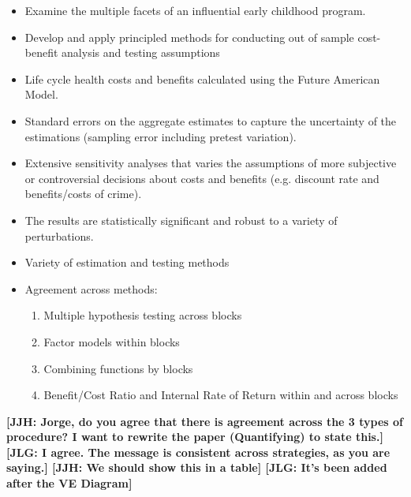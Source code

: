 \documentclass[static]{JJH-Beamer}
\begin{document}
\begin{frame}

\begin{itemize}
\item Examine the multiple facets of an influential early childhood program.
\item Develop and apply principled methods for conducting out of sample cost-benefit analysis and testing assumptions
\item Life cycle health costs and benefits calculated using the Future American Model.
\item Standard errors on the aggregate estimates to capture the uncertainty of the estimations (sampling error including pretest variation).
\item Extensive sensitivity analyses that varies the assumptions of more subjective or controversial decisions about costs and benefits (e.g. discount rate and benefits/costs of crime).
\item The results are statistically significant and robust to a variety of perturbations.
\end{itemize}

\end{frame}

\begin{frame}

\begin{itemize}
\item Variety of estimation and testing methods
\item Agreement across methods:
    \begin{enumerate}
    \item Multiple hypothesis testing across blocks
    \item Factor models within blocks
    \item Combining functions by blocks
    \item Benefit/Cost Ratio and Internal Rate of Return within and across blocks
    \end{enumerate}
\end{itemize}

\end{frame}

\textbf{[JJH: Jorge, do you agree that there is agreement across the 3 types of procedure? I want to rewrite the paper (Quantifying) to state this.] [JLG: I agree. The message is consistent across strategies, as you are saying.] [JJH: We should show this in a table] [JLG: It's been added after the VE Diagram]}
\end{document}
